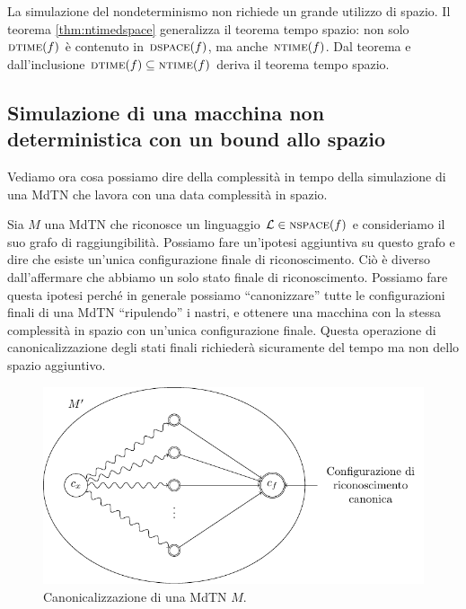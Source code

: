 La simulazione del nondeterminismo non richiede un grande utilizzo di spazio. Il teorema
\ref{thm:ntimedspace} generalizza il teorema tempo spazio: non solo $\textsc{dtime}(f)$ è contenuto in
$\textsc{dspace}(f)$, ma anche $\textsc{ntime}(f)$. Dal teorema e dall'inclusione $\textsc{dtime}(f) \subseteq \textsc{ntime}(f)$
deriva il teorema tempo spazio.

\subsection{Simulazione di una macchina non deterministica con un bound allo spazio}

Vediamo ora cosa possiamo dire della complessità in tempo della simulazione di una MdTN che lavora
con una data complessità in spazio.

Sia $M$ una MdTN che riconosce un linguaggio $\mathcal{L} \in \textsc{nspace}(f)$ e consideriamo il suo grafo di
raggiungibilità. Possiamo fare un'ipotesi aggiuntiva su questo grafo e dire che esiste un'unica
configurazione finale di riconoscimento. Ciò è diverso dall'affermare che abbiamo un solo stato
finale di riconoscimento. Possiamo fare questa ipotesi perché in generale possiamo ``canonizzare''
tutte le configurazioni finali di una MdTN ``ripulendo'' i nastri, e ottenere una macchina con la
stessa complessità in spazio con un'unica configurazione finale. Questa operazione di
canonicalizzazione degli stati finali richiederà sicuramente del tempo ma non dello spazio
aggiuntivo.

\begin{figure}[h]
    \begin{center}
        \includegraphics[scale=0.7]{./img/nondeterminism/Canonicalization.pdf}
        \caption{Canonicalizzazione di una MdTN $M$.}
    \end{center}
\end{figure}

